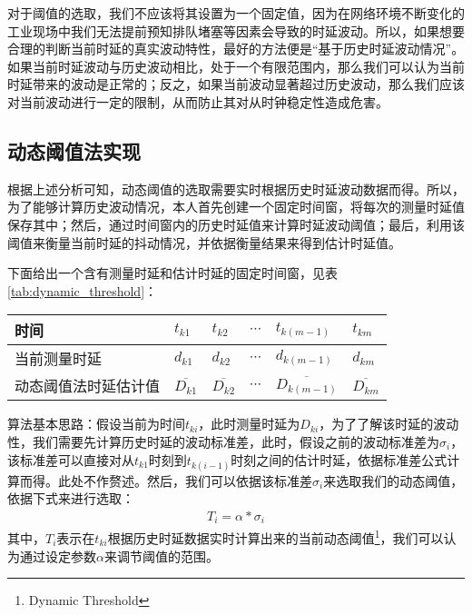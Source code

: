 对于阈值的选取，我们不应该将其设置为一个固定值，因为在网络环境不断变化的工业现场中我们无法提前预知排队堵塞等因素会导致的时延波动。所以，如果想要合理的判断当前时延的真实波动特性，最好的方法便是“基于历史时延波动情况”。如果当前时延波动与历史波动相比，处于一个有限范围内，那么我们可以认为当前时延带来的波动是正常的；反之，如果当前波动显著超过历史波动，那么我们应该对当前波动进行一定的限制，从而防止其对从时钟稳定性造成危害。

\subsection{动态阈值法实现}
根据上述分析可知，动态阈值的选取需要实时根据历史时延波动数据而得。所以，为了能够计算历史波动情况，本人首先创建一个固定时间窗，将每次的测量时延值保存其中；然后，通过时间窗内的历史时延值来计算时延波动阈值；最后，利用该阈值来衡量当前时延的抖动情况，并依据衡量结果来得到估计时延值。

下面给出一个含有测量时延和估计时延的固定时间窗，见表\ref{tab:dynamic_threshold}：
\begin{table}[!hpb]
  \centering
  \begin{tabular}{llllll} \toprule
  	时间 & $t_{k1}$ & $t_{k2}$ & $\cdots$ & $t_{k(m-1)}$ & $t_{km}$ \\ \midrule
    当前测量时延 & $d_{k1}$ & $d_{k2}$ & $\cdots$ & $d_{k(m-1)}$ & $d_{km}$ \\ \midrule
    动态阈值法时延估计值 & $\overline{D_{k1}}$ & $\overline{D_{k2}}$ & $\cdots$ & $\overline{D_{k(m-1)}}$ & $\overline{D_{km}}$  \\ \bottomrule
  \end{tabular}
\end{table}

算法基本思路：假设当前为时间$t_{ki}$，此时测量时延为$D_{ki}$，为了了解该时延的波动性，我们需要先计算历史时延的波动标准差，此时，假设之前的波动标准差为$\sigma_{i}$，该标准差可以直接对从$t_{k1}$时刻到$t_{k(i-1)}$时刻之间的估计时延，依据标准差公式计算而得。此处不作赘述。然后，我们可以依据该标准差$\sigma_{i}$来选取我们的动态阈值，依据下式来进行选取：
\begin{align}
T_{i} = \alpha * \sigma_{i}
\end{align}
其中，$T_{i}$表示在$t_{ki}$根据历史时延数据实时计算出来的当前动态阈值\footnote{Dynamic Threshold}，我们可以认为通过设定参数$\alpha$来调节阈值的范围。

